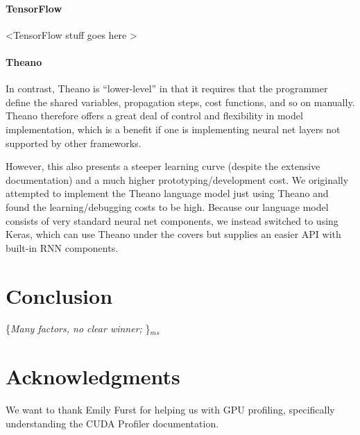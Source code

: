 \documentclass{article}
\newcommand{\ms}[1]{{\color{cyan}\{\textit{#1}\}$_{ms}$}}
\begin{document}
\paragraph{TensorFlow} \textless TensorFlow stuff goes here \textgreater

\paragraph{Theano} 
In contrast, Theano is ``lower-level'' in that it requires that the programmer define the shared variables, propagation steps, cost functions, and so on manually. Theano therefore offers a great deal of control and flexibility in model implementation, which is a benefit if one is implementing neural net layers not supported by other frameworks.

However, this also presents a steeper learning curve (despite the extensive documentation) and a much higher prototyping/development cost. We originally attempted to implement the Theano language model just using Theano and found the learning/debugging costs to be high. Because our language model consists of very standard neural net components, we instead switched to using Keras, which can use Theano under the covers but supplies an easier API with built-in RNN components.



\section{Conclusion}
\ms{Many factors, no clear winner; }

\section*{Acknowledgments}
We want to thank Emily Furst for helping us with GPU profiling, specifically understanding the CUDA Profiler documentation.
\newpage


\end{document}
